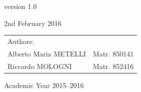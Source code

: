 \begin{titlepage}
\begin{center}
version 1.0
\par\end{center}

\begin{center}
2nd February 2016
\par\end{center}

\begin{flushleft}
\vspace{0.5cm}

\par\end{flushleft}

\begin{flushright}
\begin{tabular}{ll}
Authors: & \tabularnewline
Alberto Maria METELLI & Matr. 850141\tabularnewline
Riccardo MOLOGNI & Matr. 852416\tabularnewline
\end{tabular}
\par\end{flushright}

\begin{flushleft}
\vspace{1.8cm}

\par\end{flushleft}

\begin{center}
{\large{}Academic Year 2015–2016}
\par\end{center}{\large \par}

\end{titlepage}

